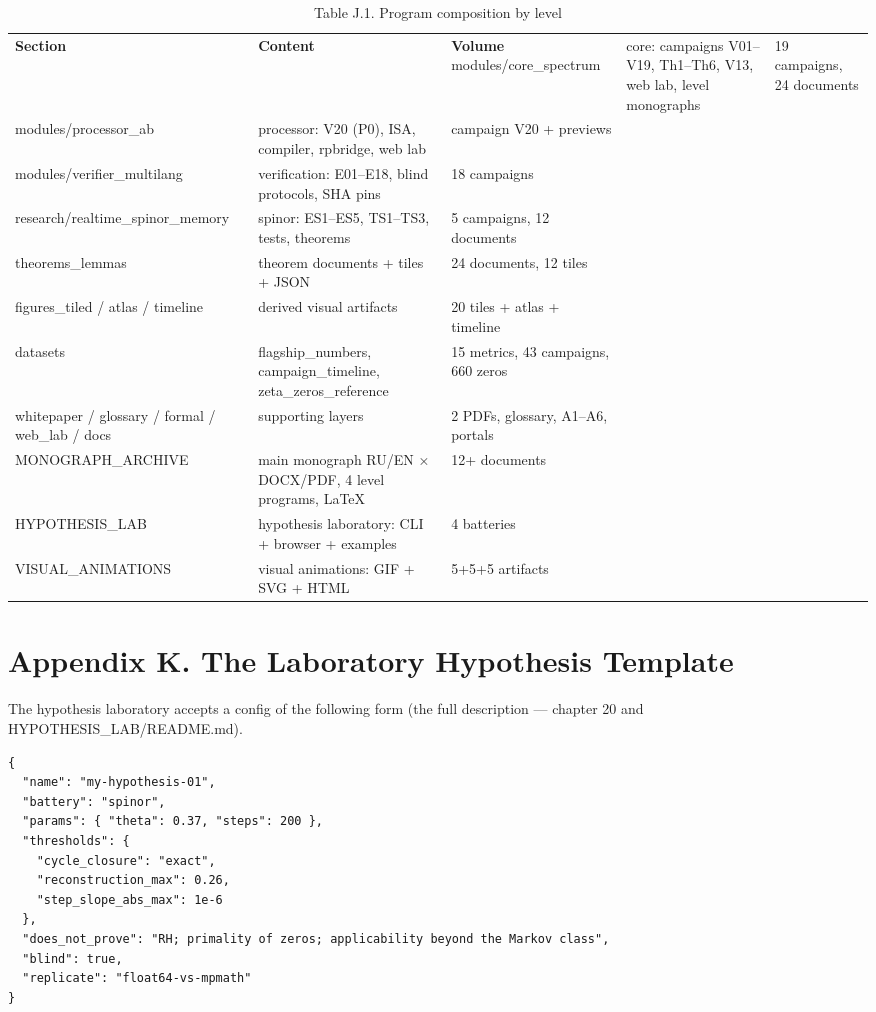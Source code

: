 \documentclass[11pt,a4paper]{article}
\begin{document}
\begin{table}[htbp]\centering\small
\caption{Table J.1. Program composition by level}
\begin{tabular}{p{} p{} p{}}
\toprule
\textbf{Section} & \textbf{Content} & \textbf{Volume}
\midrule
modules/core\_spectrum & core: campaigns V01–V19, Th1–Th6, V13, web lab, level monographs & 19 campaigns, 24 documents \\
modules/processor\_ab & processor: V20 (P0), ISA, compiler, rpbridge, web lab & campaign V20 + previews \\
modules/verifier\_multilang & verification: E01–E18, blind protocols, SHA pins & 18 campaigns \\
research/realtime\_spinor\_memory & spinor: ES1–ES5, TS1–TS3, tests, theorems & 5 campaigns, 12 documents \\
theorems\_lemmas & theorem documents + tiles + JSON & 24 documents, 12 tiles \\
figures\_tiled / atlas / timeline & derived visual artifacts & 20 tiles + atlas + timeline \\
datasets & flagship\_numbers, campaign\_timeline, zeta\_zeros\_reference & 15 metrics, 43 campaigns, 660 zeros \\
whitepaper / glossary / formal / web\_lab / docs & supporting layers & 2 PDFs, glossary, A1–A6, portals \\
MONOGRAPH\_ARCHIVE & main monograph RU/EN × DOCX/PDF, 4 level programs, LaTeX & 12+ documents \\
HYPOTHESIS\_LAB & hypothesis laboratory: CLI + browser + examples & 4 batteries \\
VISUAL\_ANIMATIONS & visual animations: GIF + SVG + HTML & 5+5+5 artifacts \\
\bottomrule
\end{tabular}
\end{table}

\section{Appendix K. The Laboratory Hypothesis Template}

The hypothesis laboratory accepts a config of the following form (the full description — chapter 20 and HYPOTHESIS\_LAB/README.md).

\begin{verbatim}
{
  "name": "my-hypothesis-01",
  "battery": "spinor",
  "params": { "theta": 0.37, "steps": 200 },
  "thresholds": {
    "cycle_closure": "exact",
    "reconstruction_max": 0.26,
    "step_slope_abs_max": 1e-6
  },
  "does_not_prove": "RH; primality of zeros; applicability beyond the Markov class",
  "blind": true,
  "replicate": "float64-vs-mpmath"
}
\end{verbatim}
\end{document}
